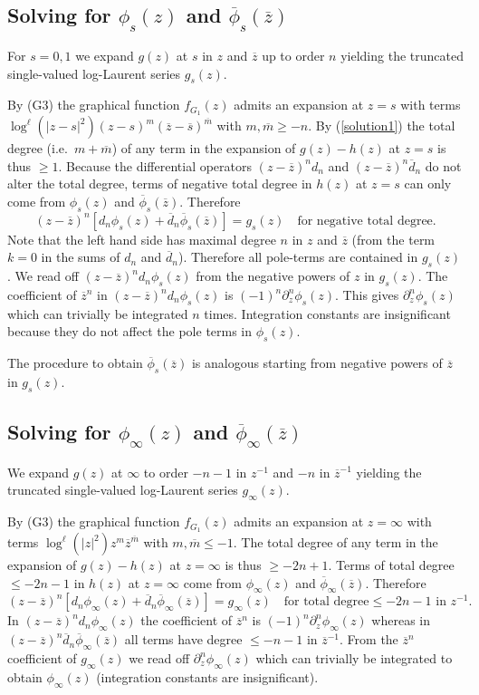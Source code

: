 \documentclass[oneside]{amsart}
\newcommand{\ddd}{{\overline{d}}}
\newcommand{\mm}{{\overline{m}}}
\newcommand{\sss}{{\overline{s}}}
\newcommand{\zz}{{\overline{z}}}
\theoremstyle{plain}
\begin{document}
\subsection{Solving for \texorpdfstring{$\phi_s(z)$}{phi(s,z)} and \texorpdfstring{$\overline{\phi}_s(\zz)$}{phibar(s,zbar)}}
For $s=0,1$ we expand $g(z)$ at $s$ in $z$ and $\zz$ up to order $n$ yielding the truncated single-valued log-Laurent series $g_s(z)$.

By (G3) the graphical function $f_{G_1}(z)$ admits an expansion at $z=s$ with terms $\log^\ell(|z-s|^2)(z-s)^m(\zz-\sss)^\mm$ with $m,\mm\geq-n$.
By (\ref{solution1}) the total degree (i.e.\ $m+\mm$) of any term in the expansion of $g(z)-h(z)$ at $z=s$ is thus $\geq1$.
Because the differential operators $(z-\zz)^nd_n$ and $(z-\zz)^n\ddd_n$ do not alter the total degree, terms of negative total degree in $h(z)$ at $z=s$
can only come from $\phi_s(z)$ and $\overline{\phi}_s(\zz)$. Therefore
$$
(z-\zz)^n[d_n\phi_s(z)+\ddd_n\overline{\phi}_s(\zz)]=g_s(z)\quad\text{for negative total degree.}
$$
Note that the left hand side has maximal degree $n$ in $z$ and $\zz$ (from the term $k=0$ in the sums of $d_n$ and $\ddd_n$).
Therefore all pole-terms are contained in $g_s(z)$. We read off $(z-\zz)^nd_n\phi_s(z)$ from the negative powers of $z$ in $g_s(z)$.
The coefficient of $\zz^n$ in $(z-\zz)^nd_n\phi_s(z)$ is $(-1)^n\partial_z^n\phi_s(z)$. This gives $\partial_z^n\phi_s(z)$ which can trivially be integrated $n$ times. Integration constants
are insignificant because they do not affect the pole terms in $\phi_s(z)$.

The procedure to obtain $\overline{\phi}_s(\zz)$ is analogous starting from negative powers of $\zz$ in $g_s(z)$.

\subsection{Solving for \texorpdfstring{$\phi_\infty(z)$}{phi(infty,z)} and \texorpdfstring{$\overline{\phi}_\infty(\zz)$}{phibar(infty,zbar)}}
We expand $g(z)$ at $\infty$ to order $-n-1$ in $z^{-1}$ and $-n$ in $\zz^{-1}$ yielding the truncated single-valued log-Laurent series $g_\infty(z)$.

By (G3) the graphical function $f_{G_1}(z)$ admits an expansion at $z=\infty$ with terms $\log^\ell(|z|^2)z^m\zz^\mm$ with $m,\mm\leq-1$.
The total degree of any term in the expansion of $g(z)-h(z)$ at $z=\infty$ is thus $\geq-2n+1$. Terms of total degree $\leq-2n-1$ in $h(z)$ at $z=\infty$
come from $\phi_\infty(z)$ and $\overline{\phi}_\infty(\zz)$. Therefore
$$
(z-\zz)^n[d_n\phi_\infty(z)+\ddd_n\overline{\phi}_\infty(\zz)]=g_\infty(z)\quad\text{for total degree}\leq-2n-1\text{ in }z^{-1}.
$$
In $(z-\zz)^nd_n\phi_\infty(z)$ the coefficient of $\zz^n$ is $(-1)^n\partial_z^n\phi_\infty(z)$ whereas in $(z-\zz)^n\ddd_n\overline{\phi}_\infty(\zz)$ all terms have degree
$\leq-n-1$ in $\zz^{-1}$. From the $\zz^n$ coefficient of $g_\infty(z)$ we read off $\partial_z^n\phi_\infty(z)$ which can trivially be integrated to
obtain $\phi_\infty(z)$ (integration constants are insignificant).
\end{document}
